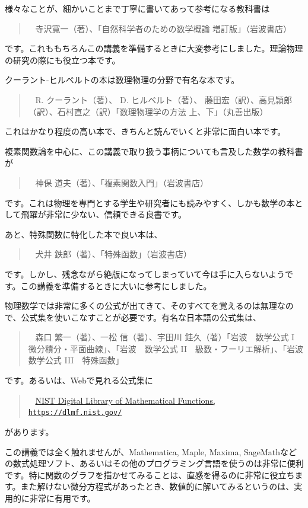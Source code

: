 \documentclass[report,paper=a4, fontsize=12pt, line_length=16cm, number_of_lines=33,dvipdfmx]{jlreq}
\newenvironment{mycite}{\begin{quote} \sffamily \textbullet\ }{\end{quote}}
\numberwithin{equation}{section}
\begin{document}
様々なことが、細かいことまで丁寧に書いてあって参考になる教科書は
\begin{mycite}
  寺沢寛一（著）、「自然科学者のための数学概論 増訂版」（岩波書店）
\end{mycite}
です。これももちろんこの講義を準備するときに大変参考にしました。理論物理の研究の際にも役立つ本です。

クーラント-ヒルベルトの本は数理物理の分野で有名な本です。
\begin{mycite}
  R. クーラント（著）、 D. ヒルベルト（著）、 藤田宏（訳）、高見頴郎（訳）、石村直之（訳）「数理物理学の方法 上、下」（丸善出版）
\end{mycite}
これはかなり程度の高い本で、きちんと読んでいくと非常に面白い本です。

複素関数論を中心に、この講義で取り扱う事柄についても言及した数学の教科書が
\begin{mycite}
  神保 道夫（著）、「複素関数入門」（岩波書店）
\end{mycite}
です。これは物理を専門とする学生や研究者にも読みやすく、しかも数学の本として飛躍が非常に少ない、信頼できる良書です。

あと、特殊関数に特化した本で良い本は、
\begin{mycite}
  犬井 鉄郎（著）、「特殊函数」（岩波書店）  
\end{mycite}
です。しかし、残念ながら絶版になってしまっていて今は手に入らないようです。この講義を準備するときに大いに参考にしました。

物理数学では非常に多くの公式が出てきて、そのすべてを覚えるのは無理なので、公式集を使いこなすことが必要です。有名な日本語の公式集は、
\begin{mycite}
森口 繁一（著）、一松 信（著）、宇田川 銈久（著）「岩波　数学公式 I　微分積分・平面曲線」、「岩波　数学公式 II　級数・フーリエ解析」、「岩波　数学公式 III　特殊函数」
\end{mycite}
です。あるいは、Webで見れる公式集に
\begin{mycite}
  \href{https://dlmf.nist.gov/}{NIST Digital Library of Mathematical Functions, \texttt{https://dlmf.nist.gov/}}
\end{mycite}
があります。

この講義では全く触れませんが、Mathematica, Maple, Maxima, SageMathなどの数式処理ソフト、あるいはその他のプログラミング言語を使うのは非常に便利です。特に関数のグラフを描かせてみることは、直感を得るのに非常に役立ちます。また解けない微分方程式があったとき、数値的に解いてみるというのは、実用的に非常に有用です。
\end{document}
